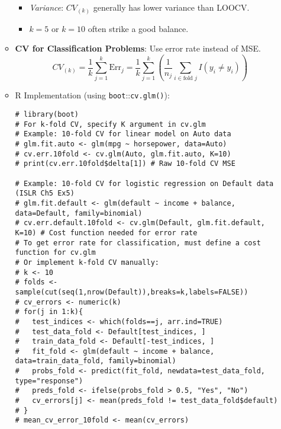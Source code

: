 \documentclass[12pt,a4paper]{article}
\newcommand{\Rpackage}[1]{\texttt{#1}} %
\newcommand{\Rfunction}[1]{\texttt{#1()}} %
\begin{document}
\begin{itemize}
\begin{itemize}
\begin{itemize}
                    \item \textit{Variance}: $CV_{(k)}$ generally has lower variance than LOOCV.
                    \item $k=5$ or $k=10$ often strike a good balance.
                \end{itemize}
            \item \textbf{CV for Classification Problems}: Use error rate instead of MSE.
                $$ CV_{(k)} = \frac{1}{k} \sum_{j=1}^{k} \text{Err}_j = \frac{1}{k} \sum_{j=1}^{k} \left( \frac{1}{n_j} \sum_{i \in \text{fold }j} I(y_i \neq \hat{y}_i) \right) $$
            \item R Implementation (using \Rpackage{boot}::\Rfunction{cv.glm}):
\begin{lstlisting}[caption={k-Fold CV using boot::cv.glm}]
# library(boot)
# For k-fold CV, specify K argument in cv.glm
# Example: 10-fold CV for linear model on Auto data
# glm.fit.auto <- glm(mpg ~ horsepower, data=Auto)
# cv.err.10fold <- cv.glm(Auto, glm.fit.auto, K=10)
# print(cv.err.10fold$delta[1]) # Raw 10-fold CV MSE

# Example: 10-fold CV for logistic regression on Default data (ISLR Ch5 Ex5)
# glm.fit.default <- glm(default ~ income + balance, data=Default, family=binomial)
# cv.err.default.10fold <- cv.glm(Default, glm.fit.default, K=10) # Cost function needed for error rate
# To get error rate for classification, must define a cost function for cv.glm
# Or implement k-fold CV manually:
# k <- 10
# folds <- sample(cut(seq(1,nrow(Default)),breaks=k,labels=FALSE))
# cv_errors <- numeric(k)
# for(j in 1:k){
#   test_indices <- which(folds==j, arr.ind=TRUE)
#   test_data_fold <- Default[test_indices, ]
#   train_data_fold <- Default[-test_indices, ]
#   fit_fold <- glm(default ~ income + balance, data=train_data_fold, family=binomial)
#   probs_fold <- predict(fit_fold, newdata=test_data_fold, type="response")
#   preds_fold <- ifelse(probs_fold > 0.5, "Yes", "No")
#   cv_errors[j] <- mean(preds_fold != test_data_fold$default)
# }
# mean_cv_error_10fold <- mean(cv_errors)
\end{lstlisting}
        \end{itemize}


\end{itemize}
\end{document}
